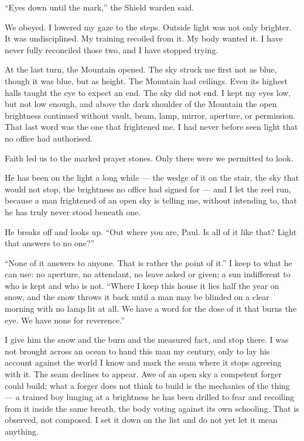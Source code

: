 ``Eyes down until the mark,'' the Shield warden said.\par

We obeyed. I lowered my gaze to the steps. Outside light was not only brighter. It was undisciplined. My training recoiled from it. My body wanted it. I have never fully reconciled those two, and I have stopped trying.\par

At the last turn, the Mountain opened. The sky struck me first not as blue, though it was blue, but as height. The Mountain had ceilings. Even its highest halls taught the eye to expect an end. The sky did not end. I kept my eyes low, but not low enough, and above the dark shoulder of the Mountain the open brightness continued without vault, beam, lamp, mirror, aperture, or permission. That last word was the one that frightened me. I had never before seen light that no office had authorised.\par

Faith led us to the marked prayer stones. Only there were we permitted to look.\par

\ornament

\noindent He has been on the light a long while --- the wedge of it on the stair, the sky that would not stop, the brightness no office had signed for --- and I let the reel run, because a man frightened of an open sky is telling me, without intending to, that he has truly never stood beneath one.\par

He breaks off and looks up. ``Out where you are, Paul. Is all of it like that? Light that answers to no one?''\par

``None of it answers to anyone. That is rather the point of it.'' I keep to what he can use: no aperture, no attendant, no leave asked or given; a sun indifferent to who is kept and who is not. ``Where I keep this house it lies half the year on snow, and the snow throws it back until a man may be blinded on a clear morning with no lamp lit at all. We have a word for the dose of it that burns the eye. We have none for reverence.''\par

I give him the snow and the burn and the measured fact, and stop there. I was not brought across an ocean to hand this man my century, only to lay his account against the world I know and mark the seam where it stops agreeing with it. The seam declines to appear. Awe of an open sky a competent forger could build; what a forger does not think to build is the mechanics of the thing --- a trained boy lunging at a brightness he has been drilled to fear and recoiling from it inside the same breath, the body voting against its own schooling. That is observed, not composed. I set it down on the list and do not yet let it mean anything.\par

